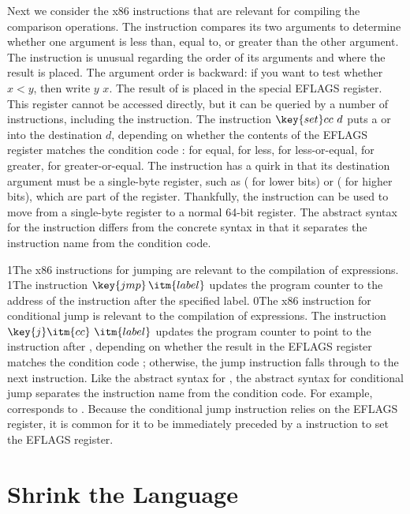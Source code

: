 \documentclass[7x10]{TimesAPriori_MIT}%
\def\racketEd{0}
\def\pythonEd{1}
\def\edition{1}
\newcommand{\racket}[1]{{\if\edition\racketEd{#1}\fi}}
\newcommand{\pythonColor}[0]{}
\newcommand{\python}[1]{{\if\edition\pythonEd\pythonColor #1\fi}}
\numberwithin{theorem}{chapter}
\numberwithin{definition}{chapter}
\numberwithin{equation}{chapter}
\begin{document}
Next we consider the x86 instructions that are relevant for compiling
the comparison operations. The  instruction compares its two
arguments to determine whether one argument is less than, equal to, or
greater than the other argument. The  instruction is unusual
regarding the order of its arguments and where the result is
placed. The argument order is backward: if you want to test whether
$x < y$, then write  $y$\code{,} $x$. The result of
 is placed in the special EFLAGS register. This register
cannot be accessed directly, but it can be queried by a number of
instructions, including the  instruction. The instruction
$\key{set}cc~d$ puts a  or  into the destination $d$,
depending on whether the contents of the EFLAGS register matches the
condition code :  for equal,  for less, 
for less-or-equal,  for greater,  for greater-or-equal.
The  instruction has a quirk in that its destination argument
must be a single-byte register, such as  ( for lower bits) or
 ( for higher bits), which are part of the 
register.  Thankfully, the  instruction can be used to
move from a single-byte register to a normal 64-bit register.  The
abstract syntax for the  instruction differs from the
concrete syntax in that it separates the instruction name from the
condition code.

\python{The x86 instructions for jumping are relevant to the
  compilation of \key{if} expressions.}
%
\python{The instruction $\key{jmp}\,\itm{label}$ updates the program
  counter to the address of the instruction after the specified
  label.}
%
\racket{The x86 instruction for conditional jump is relevant to the
  compilation of \key{if} expressions.}
%
The instruction $\key{j}\itm{cc}~\itm{label}$ updates the program
counter to point to the instruction after , depending on
whether the result in the EFLAGS register matches the condition code
; otherwise, the jump instruction falls through to the next
instruction.  Like the abstract syntax for , the abstract
syntax for conditional jump separates the instruction name from the
condition code. For example, 
corresponds to .  Because the conditional jump instruction
relies on the EFLAGS register, it is common for it to be immediately preceded by
a  instruction to set the EFLAGS register.


\section{Shrink the \LangIf{} Language}
\label{sec:shrink-Lif}
\end{document}
